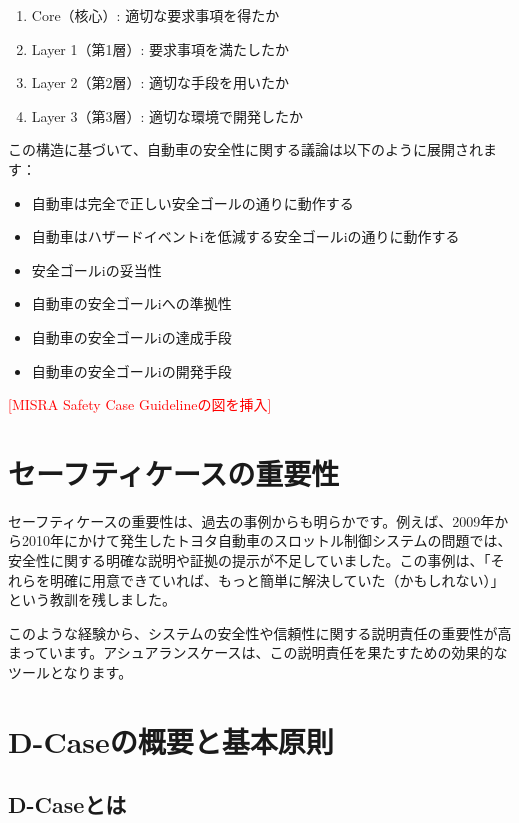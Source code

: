 \begin{enumerate}
    \item Core（核心）: 適切な要求事項を得たか
    \item Layer 1（第1層）: 要求事項を満たしたか
    \item Layer 2（第2層）: 適切な手段を用いたか
    \item Layer 3（第3層）: 適切な環境で開発したか
\end{enumerate}

この構造に基づいて、自動車の安全性に関する議論は以下のように展開されます：

\begin{itemize}
    \item 自動車は完全で正しい安全ゴールの通りに動作する
    \item 自動車はハザードイベントiを低減する安全ゴールiの通りに動作する
    \item 安全ゴールiの妥当性
    \item 自動車の安全ゴールiへの準拠性
    \item 自動車の安全ゴールiの達成手段
    \item 自動車の安全ゴールiの開発手段
\end{itemize}

\textcolor{red}{[MISRA Safety Case Guidelineの図を挿入]}

\section{セーフティケースの重要性}

セーフティケースの重要性は、過去の事例からも明らかです。例えば、2009年から2010年にかけて発生したトヨタ自動車のスロットル制御システムの問題では、安全性に関する明確な説明や証拠の提示が不足していました。この事例は、「それらを明確に用意できていれば、もっと簡単に解決していた（かもしれない）」という教訓を残しました。

このような経験から、システムの安全性や信頼性に関する説明責任の重要性が高まっています。アシュアランスケースは、この説明責任を果たすための効果的なツールとなります。

\section{D-Caseの概要と基本原則}

\subsection{D-Caseとは}

